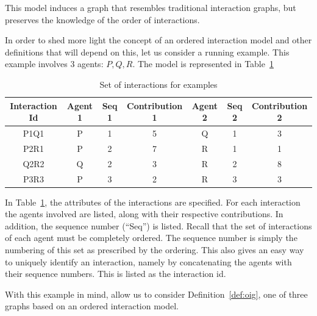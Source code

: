 \documentclass[a4paper,11pt]{book}
\theoremstyle{definition}
\begin{document}
This model induces a graph that resembles traditional interaction graphs, but preserves the knowledge
of the order of interactions.


In order to shed more light the concept of an ordered interaction model and other
definitions that will depend on this, let us consider a running example. This example involves
3 agents: $P, Q, R$. The model is represented in Table~\ref{tab:interactions}

\begin{table}[h]
    \centering
    \begin{tabular}{c|c|c|c|c|c|c}
        Interaction Id & Agent 1 & Seq 1 & Contribution 1 & Agent 2 & Seq 2 & Contribution 2 \\\hline
        P1Q1           & P       & 1                 & 5            & Q       & 1                 & 3            \\
        P2R1           & P       & 2                 & 7            & R       & 1                 & 1            \\
        Q2R2           & Q       & 2                 & 3            & R       & 2                 & 8            \\
        P3R3           & P       & 3                 & 2            & R       & 3                 & 3            \\
    \end{tabular}
    \caption{Set of interactions for examples}
    \label{tab:interactions}
\end{table}

In Table~\ref{tab:interactions}, the attributes of the interactions are specified. For each interaction the
agents involved are listed, along with their respective contributions.
In addition, the sequence number (``Seq'') is listed. Recall that the set of interactions of each agent must
be completely ordered. The sequence number is
simply the numbering of this set as prescribed by the ordering. This also gives an easy way to uniquely
identify an interaction, namely by concatenating the agents with their sequence numbers. This is listed
as the interaction id.

With this example in mind, allow us to consider Definition~\ref{def:oig}, one of three graphs based on 
an ordered interaction model.
\end{document}
